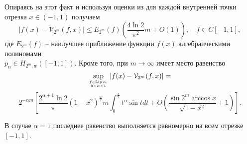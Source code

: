 Опираясь на этот факт и используя оценки из \cite{sms14}\cite{sms15}
для каждой внутренней точки отрезка $x \in (-1, 1)$ получаем
\begin{equation}
\label{sms1v2mforC}
\left| f(x) - \mathcal{V}_{2^m}(f, x) \right| \leq
E_{2^{m}}(f) \left(\frac{4 \ln{2}}{\pi^2}m + O(1)\right),  \quad f \in C[-1,1],
\end{equation}
где $E_{2^m}(f)$ -- наилучшее приближение функции $f(x)$ алгебраическими полиномами \\ $p_n\in H_{2^{m}, w}([-1; 1])$. Кроме того, при $m \rightarrow \infty$ имеет  место равенство %
\begin{equation*}
\sup_{f \in \operatorname{Lip}{\alpha}, \atop 0 < \alpha < 1} \left| f(x) - \mathcal{V}_{2^m}(f,x) \right| =
\end{equation*}
\begin{equation}
\label{sms1lipshitz}
2^{-\alpha m} \left[
\frac{2^{\alpha+1}\ln{2}}{\pi} \left( 1-x^2 \right)^{\frac{\alpha}{2}}m
\int_{0}^{\frac{\pi}{2}} t^{\alpha} \sin{t} dt +
O \left( \frac{\sin{2^{m} \arccos {x}}}{\sqrt{1-x^2}} + 1\right)
\right].
\end{equation}

\begin{remark} \label{sms_remark2}
В случае $\alpha = 1$ последнее равенство выполняется равномерно на всем отрезке $[-1, 1]$.
\end{remark}

